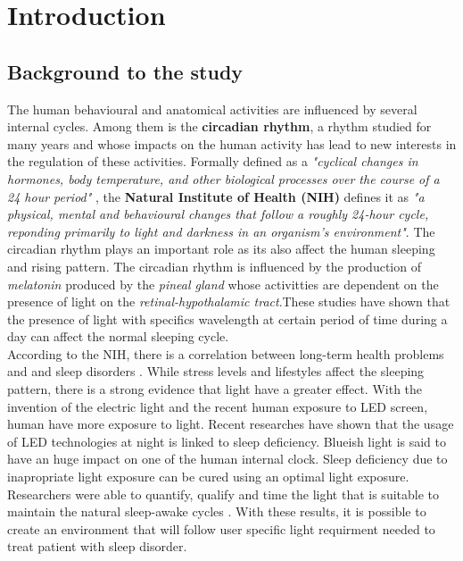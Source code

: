 \chapter{Introduction}

\section{Background to the study}

The human behavioural and anatomical activities are influenced by several internal cycles. Among them is the \textbf{circadian rhythm}, a rhythm studied for many years and whose impacts on the human activity has lead to new interests in the regulation of these activities. Formally defined as a \textit{"cyclical changes in hormones, body temperature, and other biological processes over the course of a 24 hour period"} \cite{ge2014}, the \textbf{Natural Institute of Health (NIH)} defines it as \textit{"a physical, mental and behavioural changes that follow a roughly 24-hour cycle, reponding primarily to light and darkness in an organism's environment"}\cite{ge2014}. The circadian rhythm plays an important role as its also affect the human sleeping and rising pattern. The circadian rhythm is influenced by the production of \textit{melatonin} produced by the \textit{pineal gland} whose activitties are dependent on the presence of light on the \textit{retinal-hypothalamic tract}\cite{lig1994}.These studies have shown that the presence of light with specifics wavelength at certain period of time during a day can affect the normal sleeping cycle.\\   
According to the NIH, there is a correlation between long-term health problems and and sleep disorders \cite{ph2002}. While stress levels and lifestyles affect the sleeping pattern, there is a strong evidence that light have a greater effect. With the invention of the electric light and the recent human exposure to LED screen, human have more exposure to light. Recent researches have shown that the usage of LED technologies at night is linked to sleep deficiency. Blueish light is said to have an huge impact on one of the human internal clock. Sleep deficiency due to inapropriate light exposure can be cured using an optimal light exposure. Researchers were able to quantify, qualify and time the light that is suitable to maintain the natural sleep-awake cycles \cite{cir2014}. With these results, it is possible to create an environment that will follow user specific light requirment needed to treat patient with sleep disorder.


